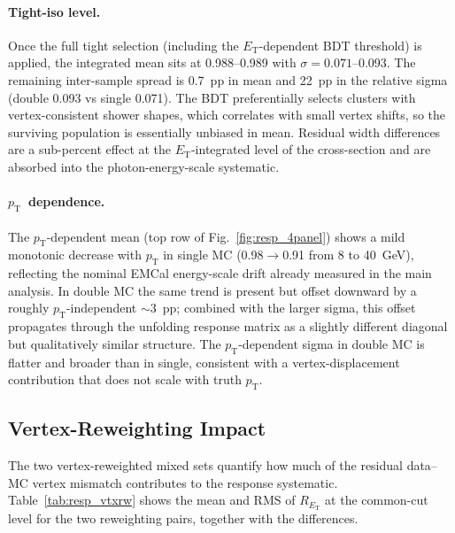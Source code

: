 \documentclass[11pt,letterpaper]{article}
\newcommand{\pT}{\ensuremath{p_{\text{T}}}}
\newcommand{\ET}{\ensuremath{E_{\text{T}}}}
\begin{document}
\paragraph{Tight-iso level.}
Once the full tight selection (including the \ET-dependent BDT threshold)
is applied, the integrated mean sits at 0.988--0.989 with $\sigma =
0.071$--0.093. The remaining inter-sample spread is 0.7~pp in mean and
22~pp in the relative sigma (double 0.093 vs single 0.071). The BDT
preferentially selects clusters with vertex-consistent shower shapes,
which correlates with small vertex shifts, so the surviving population
is essentially unbiased in mean. Residual width differences are a
sub-percent effect at the \ET-integrated level of the cross-section and
are absorbed into the photon-energy-scale systematic.

\paragraph{\pT\ dependence.}
The \pT-dependent mean (top row of Fig.~\ref{fig:resp_4panel}) shows a
mild monotonic decrease with \pT{} in single MC (0.98$\to$0.91 from 8 to
40~GeV), reflecting the nominal EMCal energy-scale drift already measured
in the main analysis. In double MC the same trend is present but offset
downward by a roughly \pT-independent $\sim$3~pp; combined with the larger
sigma, this offset propagates through the unfolding response matrix as a
slightly different diagonal but qualitatively similar structure. The
\pT-dependent sigma in double MC is flatter and broader than in single,
consistent with a vertex-displacement contribution that does not scale
with truth \pT.

\subsection{Vertex-Reweighting Impact}
\label{sec:resp_vtxrw_impact}

The two vertex-reweighted mixed sets quantify how much of the residual
data--MC vertex mismatch contributes to the response systematic.
Table~\ref{tab:resp_vtxrw} shows the mean and RMS of $R_{\ET}$ at the
common-cut level for the two reweighting pairs, together with the differences.
\end{document}
